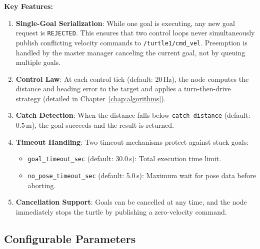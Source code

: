 \textbf{Key Features:}

\begin{enumerate}
  \item \textbf{Single-Goal Serialization}: While one goal is executing, any new goal request is \texttt{REJECTED}. This ensures that two control loops never simultaneously publish conflicting velocity commands to \texttt{/turtle1/cmd\_vel}. Preemption is handled by the master manager canceling the current goal, not by queuing multiple goals.

  \item \textbf{Control Law}: At each control tick (default: 20\,Hz), the node computes the distance and heading error to the target and applies a turn-then-drive strategy (detailed in Chapter~\ref{chap:algorithms}).

  \item \textbf{Catch Detection}: When the distance falls below \texttt{catch\_distance} (default: 0.5\,m), the goal succeeds and the result is returned.

  \item \textbf{Timeout Handling}: Two timeout mechanisms protect against stuck goals:
  \begin{itemize}
    \item \texttt{goal\_timeout\_sec} (default: 30.0\,s): Total execution time limit.
    \item \texttt{no\_pose\_timeout\_sec} (default: 5.0\,s): Maximum wait for pose data before aborting.
  \end{itemize}

  \item \textbf{Cancellation Support}: Goals can be cancelled at any time, and the node immediately stops the turtle by publishing a zero-velocity command.
\end{enumerate}

\subsection{Configurable Parameters}

